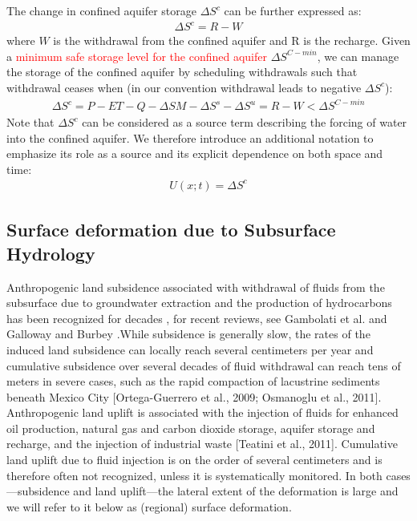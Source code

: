 \documentclass[11pt,final]{article}%
\renewcommand{\citep}{\cite}
\begin{document}
The change in confined aquifer storage $\Delta S^c$ can be further expressed as:
\begin{align}
\Delta S^c = R - W
\label{eq:confinedStorage}  
\end{align}
where $W$ is the withdrawal from the confined aquifer and R is the recharge. Given a \textcolor{red}{minimum safe storage level for the confined aquifer} $\Delta S^{C-min}$, we can manage the storage of the confined aquifer by scheduling withdrawals such that withdrawal ceases when (in our convention withdrawal leads to negative $\Delta S^c$):
\begin{align}
\Delta S^c = P-ET-Q-\Delta SM - \Delta S^s - \Delta S^u = R-W < \Delta S^{C-min}
\label{eq:safelimit}  
\end{align}
Note that $\Delta S^c$  can be considered as a source term describing the forcing of water into the confined aquifer.  We therefore introduce an additional notation to emphasize its role as a source and its explicit dependence on both space and time:
\begin{align}
U(x;t) = \Delta S^c
\label{eq:force}  
\end{align}

\subsection{Surface deformation due to Subsurface Hydrology}
Anthropogenic land subsidence associated with withdrawal of fluids from the subsurface due to groundwater extraction and the production of hydrocarbons has been recognized for decades \citep{Poland1969}, for recent reviews, see Gambolati et al. \cite{Gambolati2005} and Galloway and Burbey \cite{Galloway2011a}.While subsidence is generally slow, the rates of the induced land subsidence can locally reach several centimeters per year and cumulative subsidence over several decades of fluid withdrawal can reach tens of meters in severe cases, such as the rapid compaction of lacustrine sediments beneath Mexico City [Ortega-Guerrero et al., 2009; Osmanoglu et al., 2011]. Anthropogenic land uplift is associated with the injection of fluids for enhanced oil production, natural gas and carbon dioxide storage, aquifer storage and recharge, and the injection of industrial waste [Teatini et al., 2011]. Cumulative land uplift due to fluid injection is on the order of several centimeters and is therefore often not recognized, unless it is systematically monitored. In both cases—subsidence and land uplift—the lateral extent of the deformation is large and we will refer to it below as (regional) surface deformation.
\end{document}

